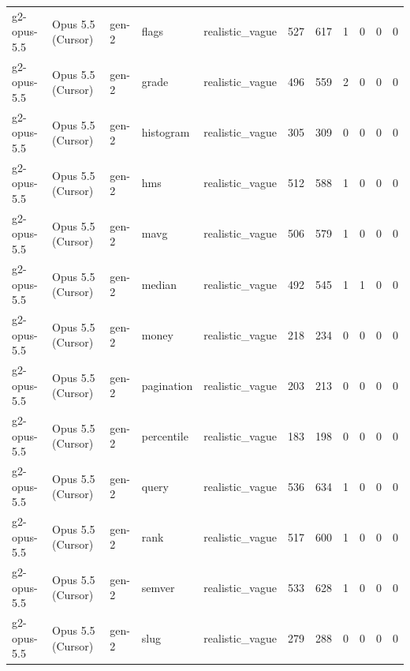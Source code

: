 \begin{tabular}{lllllllllll}
g2-opus-5.5 & Opus 5.5 (Cursor) & gen-2 & flags & realistic\_vague & 527 & 617 & 1 & 0 & 0 & 0 \\
g2-opus-5.5 & Opus 5.5 (Cursor) & gen-2 & grade & realistic\_vague & 496 & 559 & 2 & 0 & 0 & 0 \\
g2-opus-5.5 & Opus 5.5 (Cursor) & gen-2 & histogram & realistic\_vague & 305 & 309 & 0 & 0 & 0 & 0 \\
g2-opus-5.5 & Opus 5.5 (Cursor) & gen-2 & hms & realistic\_vague & 512 & 588 & 1 & 0 & 0 & 0 \\
g2-opus-5.5 & Opus 5.5 (Cursor) & gen-2 & mavg & realistic\_vague & 506 & 579 & 1 & 0 & 0 & 0 \\
g2-opus-5.5 & Opus 5.5 (Cursor) & gen-2 & median & realistic\_vague & 492 & 545 & 1 & 1 & 0 & 0 \\
g2-opus-5.5 & Opus 5.5 (Cursor) & gen-2 & money & realistic\_vague & 218 & 234 & 0 & 0 & 0 & 0 \\
g2-opus-5.5 & Opus 5.5 (Cursor) & gen-2 & pagination & realistic\_vague & 203 & 213 & 0 & 0 & 0 & 0 \\
g2-opus-5.5 & Opus 5.5 (Cursor) & gen-2 & percentile & realistic\_vague & 183 & 198 & 0 & 0 & 0 & 0 \\
g2-opus-5.5 & Opus 5.5 (Cursor) & gen-2 & query & realistic\_vague & 536 & 634 & 1 & 0 & 0 & 0 \\
g2-opus-5.5 & Opus 5.5 (Cursor) & gen-2 & rank & realistic\_vague & 517 & 600 & 1 & 0 & 0 & 0 \\
g2-opus-5.5 & Opus 5.5 (Cursor) & gen-2 & semver & realistic\_vague & 533 & 628 & 1 & 0 & 0 & 0 \\
g2-opus-5.5 & Opus 5.5 (Cursor) & gen-2 & slug & realistic\_vague & 279 & 288 & 0 & 0 & 0 & 0 \\
\bottomrule
\end{tabular}
